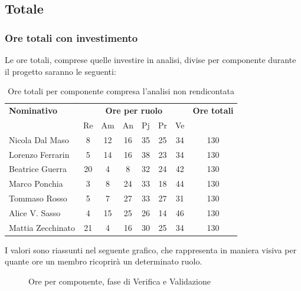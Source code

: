 \subsection{Totale}
\subsubsection{Ore totali con investimento}
Le ore totali, comprese quelle investire in analisi, divise per componente durante il progetto saranno le seguenti:

\begin{table}[H]
	\centering
	\begin{tabular}{|l|c|c|c|c|c|c|c|}
		\hline
		\textbf{Nominativo} & 
		\multicolumn{6}{c|}{\textbf{Ore per ruolo}} & 
		\textbf{Ore totali} \\
		& Re & Am & An & Pj & Pr & Ve & \\
		\hline
		Nicola Dal Maso &8 &12 &16 &35 &25 &34 & 130 \\
		Lorenzo Ferrarin &5 &14 &16 &38 &23 &34 & 130 \\
		Beatrice Guerra &20 &4 &8 &32 &24 &42 & 130 \\
		Marco Ponchia &3 &8 &24 &33 &18 &44 & 130 \\
		Tommaso Rosso &5 &7 &27 &33 &27 &31 & 130 \\
		Alice V. Sasso &4 &15 &25 &26 &14 &46 & 130 \\
		Mattia Zecchinato &21 &4 &16 &30 &25 &34 & 130 \\
		\hline
	\end{tabular}
	\caption{Ore totali per componente compresa l'analisi non rendicontata}
\end{table}
I valori sono riassunti nel seguente grafico, che rappresenta in maniera visiva per quante ore un membro ricoprirà un determinato ruolo.
\begin{figure}[H]
	\centering
	\caption{Ore per componente, fase di Verifica e Validazione}
\end{figure}

